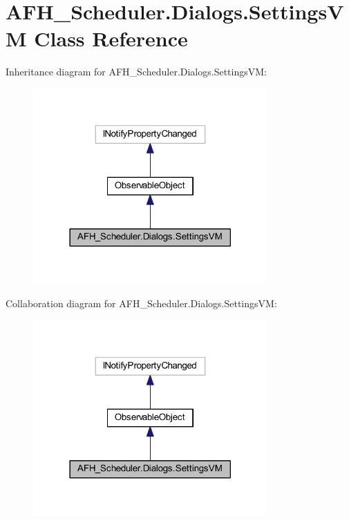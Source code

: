 \section{A\+F\+H\+\_\+\+Scheduler.\+Dialogs.\+Settings\+VM Class Reference}
\label{class_a_f_h___scheduler_1_1_dialogs_1_1_settings_v_m}


Inheritance diagram for A\+F\+H\+\_\+\+Scheduler.\+Dialogs.\+Settings\+VM\+:
\nopagebreak
\begin{figure}[H]
\begin{center}
\leavevmode
\includegraphics[width=254pt]{class_a_f_h___scheduler_1_1_dialogs_1_1_settings_v_m__inherit__graph}
\end{center}
\end{figure}


Collaboration diagram for A\+F\+H\+\_\+\+Scheduler.\+Dialogs.\+Settings\+VM\+:
\nopagebreak
\begin{figure}[H]
\begin{center}
\leavevmode
\includegraphics[width=254pt]{class_a_f_h___scheduler_1_1_dialogs_1_1_settings_v_m__coll__graph}
\end{center}
\end{figure}
